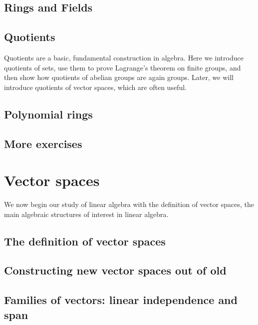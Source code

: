 \documentclass{book}
\theoremstyle{plain}
\theoremstyle{definition}
\theoremstyle{remark}
\begin{document}
\section{Rings and Fields}

\section{Quotients} \label{sec_quotients}

Quotients are a basic, fundamental construction in algebra. Here we introduce quotients of sets, use them to prove Lagrange's theorem on finite groups, and then show how quotients of abelian groups are again groups. Later, we will introduce quotients of vector spaces, which are often useful.


\section{Polynomial rings}

\section{More exercises}


\chapter{Vector spaces}

We now begin our study of linear algebra with the definition of vector spaces, the main algebraic structures of interest in linear algebra.

\section{The definition of vector spaces}

\section{Constructing new vector spaces out of old}

\section{Families of vectors: linear independence and span}
\end{document}
